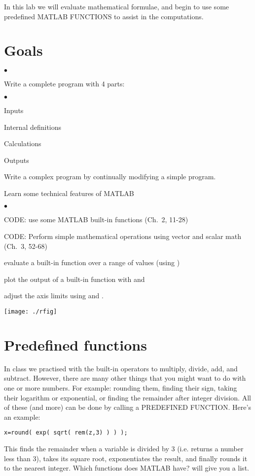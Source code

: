 \documentclass[letterpaper]{article}
\newcounter{lnum}
\newenvironment{abbrevlist}%
  {\begin{list}{$\bullet$}{\setlength{\leftmargin}{2em}%
               \setlength{\itemindent}{0em}%
               \setlength{\itemsep}{0pt}%
               \setlength{\parsep}{0pt}%
               \setlength{\topsep}{2pt}%
               \usecounter{lnum} } }{\end{list}}
\begin{document}

 

In this lab we will evaluate mathematical formulae, and begin to use some
predefined MATLAB FUNCTIONS to assist in the computations. 

\section*{Goals}
 
\begin{abbrevlist}
\item Write a complete program with 4 parts:
\begin{abbrevlist}
\item Inputs
\item Internal definitions
\item Calculations
\item Outputs
\end{abbrevlist}
\item Write a complex program by continually modifying a simple program.
\item Learn some technical features of MATLAB
\begin{abbrevlist}
\item CODE: use some MATLAB built-in functions (Ch.~2, 11-28)
\item CODE: Perform simple mathematical operations using vector and scalar math (Ch.~3, 52-68)
\item evaluate a built-in function over a range of values (using )
\item plot the output of a built-in function with  and 
\item adjust the axis limits using  and .
\end{abbrevlist}
 
 \end{abbrevlist}
  
 \begin{center} 
\texttt{[image: ./rfig]}
\end{center}




\section{Predefined functions}

In class we practised with the built-in operators to multiply, divide, add,
and subtract. However, there are many other things that you might want to do
with one or more numbers. For example: rounding them, finding their sign, taking
their logarithm or exponential, or finding the remainder after integer division.
All of these (and more) can be done by calling a PREDEFINED FUNCTION. Here's an example:
\begin{lstlisting}
x=round( exp( sqrt( rem(z,3) ) ) );
\end{lstlisting}
This finds the remainder when a variable  is divided by 3 (i.e. returns a number less than
3), takes its square root, exponentiates the result, and finally rounds it to the nearest
integer. Which functions does MATLAB have?  will give you a list.
\end{document}
